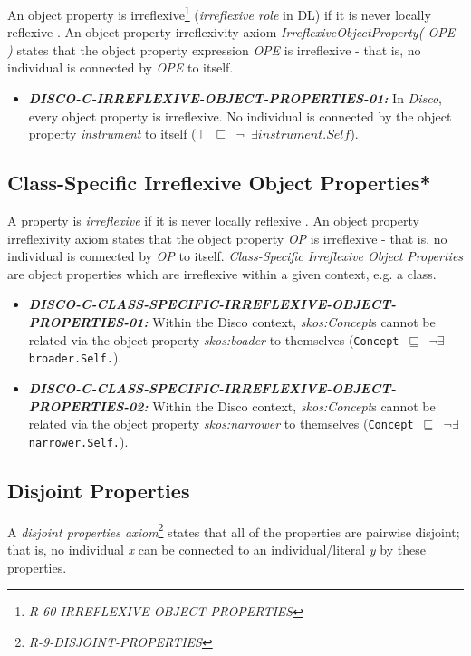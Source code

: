 \documentclass{llncs}
\newcommand{\ms}[1]{\texttt{#1}}
\begin{document}
An object property is irreflexive\footnote{\emph{R-60-IRREFLEXIVE-OBJECT-PROPERTIES}} (\emph{irreflexive role} in DL) if it is never locally reflexive \cite{Kroetzsch2012}.
An object property irreflexivity axiom \emph{IrreflexiveObjectProperty( OPE )} states that the object property expression \emph{OPE} is irreflexive - that is, no individual is connected by \emph{OPE} to itself. 

\begin{itemize}
  \item \textbf{{\em DISCO-C-IRREFLEXIVE-OBJECT-PROPERTIES-01:}}
	In \emph{Disco}, every object property is irreflexive.
  No individual is connected by the object property {\em instrument} to itself (\ms{$\top$ $\sqsubseteq$ $\neg$ $\exists  instrument . Self$}).
\end{itemize}

\subsection{Class-Specific Irreflexive Object Properties*}

A property is \emph{irreflexive} if it is never locally reflexive \cite{Kroetzsch2012}.
An object property irreflexivity axiom states that the object property \emph{OP} is irreflexive - that is, no individual is connected by \emph{OP} to itself.
\emph{Class-Specific Irreflexive Object Properties} are object properties which are irreflexive within a given context, e.g. a class. 

\begin{itemize}
  \item \textbf{{\em DISCO-C-CLASS-SPECIFIC-IRREFLEXIVE-OBJECT-PROPERTIES-01:}}
Within the Disco context, {\em skos:Concept}s cannot be related via the object property {\em skos:boader} to themselves (\ms{Concept $\sqsubseteq$ $\neg$$\exists$ broader.Self.}). 
	\item \textbf{{\em DISCO-C-CLASS-SPECIFIC-IRREFLEXIVE-OBJECT-PROPERTIES-02:}}
Within the Disco context, {\em skos:Concept}s cannot be related via the object property {\em skos:narrower} to themselves (\ms{Concept $\sqsubseteq$ $\neg$$\exists$ narrower.Self.}). 
\end{itemize}

\subsection{Disjoint Properties}

A \emph{disjoint properties axiom}\footnote{\emph{R-9-DISJOINT-PROPERTIES}} states that all of the properties are pairwise disjoint; 
that is, no individual \emph{x} can be connected to an individual/literal \emph{y} by these properties. 
\end{document}
